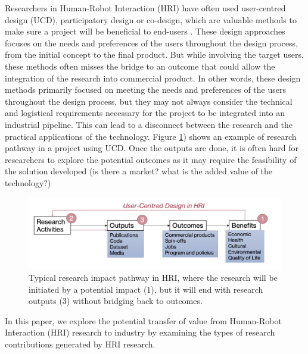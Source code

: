 \documentclass[letterpaper]{article} %
\begin{document}
Researchers in Human-Robot Interaction (HRI) have often used user-centred design (UCD), participatory design or co-design, which are valuable methods to make sure a project will be beneficial to end-users \cite{Lupetti}. These design approaches focuses on the needs and preferences of the users throughout the design process, from the initial concept to the final product.
But while involving the target users, these methods often misses the bridge to an outcome that could allow the integration of the research into commercial product.
In other words, these design methods primarily focused on meeting the needs and preferences of the users throughout the design process, but they may not always consider the technical and logistical requirements necessary for the project to be integrated into an industrial pipeline. This can lead to a disconnect between the research and the practical applications of the technology.
Figure \ref{fig:pipleine}) shows an example of research pathway in a project using UCD.  Once the outputs are done, it is often hard for researchers to explore the potential outcomes as it may require the feasibility of the solution developed (is there a market? what is the added value of the technology?) 
\begin{figure}[h]
    \centering
    \includegraphics[width=\linewidth]{RIpathwayHRI.png}
    \caption{Typical research impact pathway in HRI, where the research will be initiated by a potential impact (1), but it will end with research outputs (3) without bridging back to outcomes.}
    \label{fig:pipleine}
\end{figure}

In this paper, we explore the potential transfer of value from Human-Robot Interaction (HRI) research to industry by examining the types of research contributions generated by HRI research.
\end{document}
